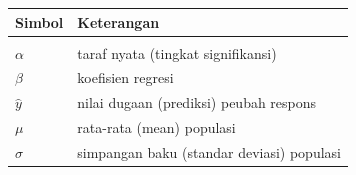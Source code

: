 \begin{singlespace}
\noindent\begin{tabularx}{\textwidth}{@{}p{3cm}X@{}}
\textbf{Simbol} & \textbf{Keterangan} \\[2pt]
\hline \\[-8pt]
$\alpha$      & taraf nyata (tingkat signifikansi) \\
$\beta$       & koefisien regresi \\
$\hat{y}$     & nilai dugaan (prediksi) peubah respons \\
$\mu$         & rata-rata (mean) populasi \\
$\sigma$      & simpangan baku (standar deviasi) populasi \\
\end{tabularx}
\end{singlespace}
